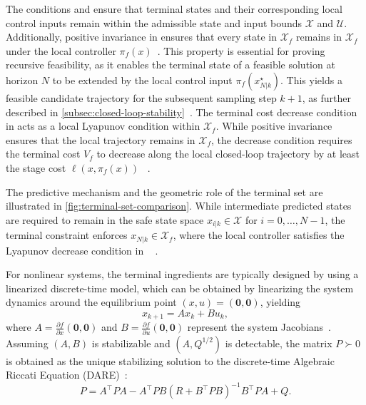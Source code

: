 The conditions  and  ensure that terminal states and their corresponding 
local control inputs remain within the admissible state and input bounds $\mathcal{X}$ and $\mathcal{U}$. 
Additionally, positive invariance in  ensures that every state in 
$\mathcal{X}_f$ remains in $\mathcal{X}_f$ under the local controller $\pi_f(x)$~. 
This property is essential for proving recursive feasibility, as it enables the terminal state of a feasible solution at horizon $N$ 
to be extended by the local control input $\pi_f(x_{N|k}^\star)$. This yields a feasible candidate trajectory for the subsequent 
sampling step $k+1$, as further described in \cref{subsec:closed-loop-stability}~.
The terminal cost decrease condition in  acts as a local Lyapunov condition within $\mathcal{X}_f$. 
While positive invariance ensures that the local trajectory remains in $\mathcal{X}_f$, the decrease condition requires 
the terminal cost $V_f$ to decrease along the local closed-loop trajectory by at least the stage cost $\ell(x,\pi_f(x))$~
.

The predictive mechanism and the geometric role of the terminal set are illustrated in \cref{fig:terminal-set-comparison}. 
While intermediate predicted states are required to remain in the 
safe state space $x_{i|k} \in \mathcal{X}$ for $i = 0, \dots, N-1$, the terminal constraint enforces $x_{N|k} \in \mathcal{X}_f$, where the local controller 
satisfies the Lyapunov decrease condition in ~
.

For nonlinear systems, the terminal ingredients are typically designed by using a linearized discrete-time model, 
which can be obtained by linearizing the system dynamics around the equilibrium point $(x, u) = (\mathbf{0}, \mathbf{0})$, yielding
\begin{equation}
    \label{eq:linearized-system}
    x_{k+1} = A x_k + B u_k,
\end{equation}
where $A = \frac{\partial f}{\partial x}(\mathbf{0}, \mathbf{0})$ and $B = \frac{\partial f}{\partial u}(\mathbf{0}, \mathbf{0})$ 
represent the system Jacobians~. 
Assuming $(A, B)$ is stabilizable and $(A, Q^{1/2})$ is detectable, the matrix
$P \succ 0$ is obtained as the unique stabilizing solution to the discrete-time
Algebraic Riccati Equation (DARE)~:
\begin{equation}
    \label{eq:riccati-equation}
    P = A^\top P A - A^\top P B \left(R + B^\top P B\right)^{-1} B^\top P A + Q.
\end{equation}

